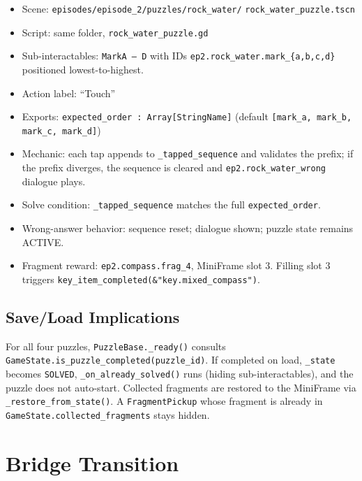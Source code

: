 \documentclass[12pt, a4paper]{article}
\begin{document}
\begin{itemize}[nosep]
  \item Scene: \texttt{episodes/episode\_2/puzzles/rock\_water/} \texttt{rock\_water\_puzzle.tscn}
  \item Script: same folder, \texttt{rock\_water\_puzzle.gd}
  \item Sub-interactables: \texttt{MarkA\,--\,D} with IDs
        \texttt{ep2.rock\_water.mark\_\{a,b,c,d\}} positioned lowest-to-highest.
  \item Action label: ``Touch''
  \item Exports: \texttt{expected\_order : Array[StringName]} (default
        \texttt{[mark\_a, mark\_b, mark\_c, mark\_d]})
  \item Mechanic: each tap appends to \texttt{\_tapped\_sequence} and validates
        the prefix; if the prefix diverges, the sequence is cleared and
        \texttt{ep2.rock\_water\_wrong} dialogue plays.
  \item Solve condition: \texttt{\_tapped\_sequence} matches the full
        \texttt{expected\_order}.
  \item Wrong-answer behavior: sequence reset; dialogue shown; puzzle state
        remains ACTIVE.
  \item Fragment reward: \texttt{ep2.compass.frag\_4}, MiniFrame slot 3.
        Filling slot 3 triggers \texttt{key\_item\_completed(\&"key.mixed\_compass")}.
\end{itemize}

\subsection{Save/Load Implications}

For all four puzzles, \texttt{PuzzleBase.\_ready()} consults
\texttt{GameState.is\_puzzle\_completed(puzzle\_id)}. If completed on load,
\texttt{\_state} becomes \texttt{SOLVED}, \texttt{\_on\_already\_solved()} runs
(hiding sub-interactables), and the puzzle does not auto-start. Collected
fragments are restored to the MiniFrame via \texttt{\_restore\_from\_state()}.
A \texttt{FragmentPickup} whose fragment is already in
\texttt{GameState.collected\_fragments} stays hidden.

\section{Bridge Transition}
\end{document}
